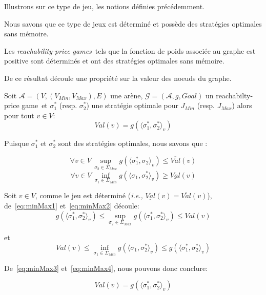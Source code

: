 Illustrons sur ce type de jeu, les notions définies précédemment.



Nous savons que ce type de jeux est déterminé et possède des stratégies optimales sans mémoire.
\begin{thm}

	\label{thm:1}
	Les \og\textit{reachability-price games}\fg~tels que la fonction de poids associée au graphe est positive sont déterminés et ont des stratégies optimales sans mémoire.
\end{thm}

De ce résultat découle une propriété sur la valeur des noeuds du graphe.

\begin{propriete}
	\label{prop:valRech}
	Soit $\mathcal{A} = (V, (V_{Min}, V_{Max}), E) $ une arène, $\mathcal{G} = (\mathcal{A}, g , Goal)$ un \og reachabilty-price game\fg~et $\sigma_1^*$ (resp. $\sigma_2^*$) une stratégie optimale pour $J_{Min}$ (resp. $J_{Max}$) alors pour tout $v \in V$:
	$$ Val(v) = g(\langle \sigma_1^*, \sigma_2^* \rangle_v)$$
\end{propriete}

\begin{demonstration}
	Puisque $\sigma_1^*$ et $\sigma_2^*$ sont des stratégies optimales, nous savons que :
	
	\begin{equation}
		\label{eq:minMax1}
		\forall v \in V \, \sup_{\sigma_2 \in \Sigma_{Max}} g(\langle \sigma_1^*, \sigma_2\rangle_v) \leq \overline{Val}(v)
	\end{equation}
	\begin{equation}
		\label{eq:minMax2}
		\forall v \in V \, \inf_{\sigma_1 \in \Sigma_{Min}} g(\langle \sigma_1, \sigma_2^*\rangle_v) \geq \underline{Val}(v)
	\end{equation}
	
	Soit $v \in V$, comme le jeu est déterminé (\emph{i.e.,} $\underline{Val}(v) = \overline{Val}(v)$), de~\eqref{eq:minMax1} et~\eqref{eq:minMax2} découle:
	\begin{equation}
		\label{eq:minMax3}
		g(\langle \sigma_1^*, \sigma_2^* \rangle_v) \leq \sup_{\sigma_2 \in \Sigma_{Max}} g(\langle \sigma_1^*, \sigma_2^*\rangle_v) \leq Val(v)
	\end{equation}
	
	et
	\begin{equation}
		\label{eq:minMax4}
		Val(v) \leq \inf_{\sigma_1 \in \Sigma_{Min}} g(\langle \sigma_1, \sigma_2^*\rangle_v) \leq g(\langle \sigma_1^*, \sigma_2^* \rangle_v)
	\end{equation}
	
	De~\eqref{eq:minMax3} et~\eqref{eq:minMax4}, nous pouvons donc conclure:
	
	$$ Val(v) = g(\langle \sigma_1^*, \sigma_2^* \rangle_v)$$
	
	
	
\end{demonstration}
	 

